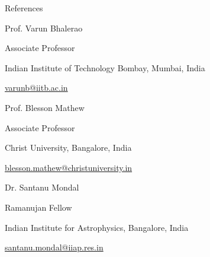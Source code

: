 \begin{rSection}{References}
\hspace{-1.2em}\begin{rSubsection}{Prof. Varun Bhalerao}{}{}{}
\vspace{-0.5em}
\item [] Associate Professor
\item [] Indian Institute of Technology Bombay, Mumbai, India
\item [] \href{mailto:varunb@iitb.ac.in}{varunb@iitb.ac.in}
\end{rSubsection}

\vspace{-0.5em}

\hspace{-1.2em}\begin{rSubsection}{Prof. Blesson Mathew}{}{}{}
\vspace{-0.5em}
\item [] Associate Professor
\item [] Christ University, Bangalore, India
\item [] \href{mailto:blesson.mathew@christuniversity.in}{blesson.mathew@christuniversity.in}
\end{rSubsection}

\vspace{-0.5em}

\hspace{-1.2em}\begin{rSubsection}{Dr. Santanu Mondal}{}{}{}
\vspace{-0.5em}
\item [] Ramanujan Fellow
\item [] Indian Institute for Astrophysics, Bangalore, India
\item [] \href{mailto:santanu.mondal@iiap.res.in}{santanu.mondal@iiap.res.in}
\end{rSubsection}
\end{rSection}
